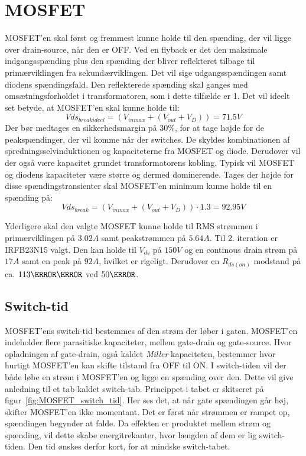 



\section{MOSFET} \label{MOSFET}
MOSFET'en skal først og fremmest kunne holde til den spænding, der vil ligge over drain-source, når den er OFF. Ved en flyback er det den maksimale indgangsspænding plus den spænding der bliver reflekteret tilbage til primærviklingen fra sekundærviklingen. Det vil sige udgangsspændingen samt diodens spændingsfald. Den reflekterede spænding skal ganges med omsætningsforholdet i transformatoren, som i dette tilfælde er 1. Det vil ideelt set betyde, at MOSFET'en skal kunne holde til:
\begin{equation} \label{Vds_breakideel}
Vds_{breakideel} = (V_{inmax}+(V_{out}+V_D))= 71.5V
\end{equation}
Der bør medtages en sikkerhedsmargin på $30\percent$, for at tage højde for de peakspændinger, der vil komme når der switches. De skyldes kombinationen af spredningsselvinduktionen og kapaciteterne fra MOSFET og diode. Derudover vil der også være kapacitet grundet transformatorens kobling. Typisk vil MOSFET og diodens kapaciteter være større og dermed dominerende. Tages der højde for disse spændingstransienter skal MOSFET'en minimum kunne holde til en spænding på: 
\begin{equation} \label{Vds_break}
Vds_{break} = (V_{inmax}+(V_{out}+V_D)) \cdot 1.3 = 92.95V
\end{equation}

Yderligere skal den valgte MOSFET kunne holde til RMS strømmen i primærviklingen på $3.02A$ samt peakstrømmen på $5.64A$.
Til 2. iteration er IRFB23N15 valgt\cite{IRFB23N15}. Den kan holde til $V_{ds}$ på $150V$ og en continous drain strøm på $17A$ samt en peak på $92A$, hvilket er rigeligt. Derudover en $R_{ds(on)}$ modstand på ca. $113\milli \ohm$ ved $50\degreeCelsius$. 

\subsection{Switch-tid}
MOSFET'ens switch-tid bestemmes af den strøm der løber i gaten. MOSFET'en indeholder flere parasitiske kapaciteter, mellem gate-drain og gate-source. Hvor opladningen af gate-drain, også kaldet \textit{Miller} kapaciteten, bestemmer hvor hurtigt MOSFET'en kan skifte tilstand fra OFF til ON. I switch-tiden vil der både løbe en strøm i MOSFET'en og ligge en spænding over den. Dette vil give anledning til et tab kaldet switch-tab. Princippet i tabet er skitseret på figur~\ref{fig:MOSFET_switch_tid}\cite[p.~16]{RMS-current}. Her ses det, at når gate spændingen går høj, skifter MOSFET'en ikke momentant. Det er først når strømmen er rampet op, spændingen begynder at falde. Da effekten er produktet mellem strøm og spænding, vil dette skabe energitrekanter, hvor længden af dem er lig switch-tiden. Den tid ønskes derfor kort, for at mindske switch-tabet. 


